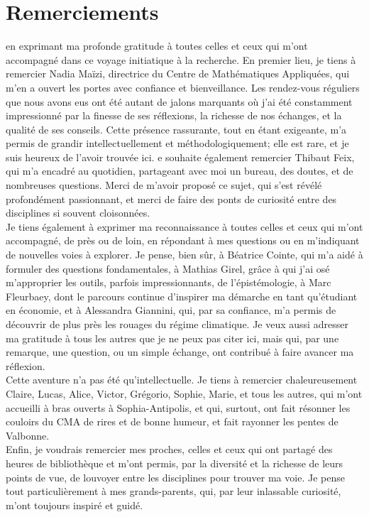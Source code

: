 \chapter*{Remerciements}


en exprimant ma profonde gratitude à toutes celles et ceux qui m’ont accompagné dans ce voyage initiatique à la recherche. En premier lieu, je tiens à remercier Nadia Maïzi, directrice du Centre de Mathématiques Appliquées, qui m'en a ouvert les portes avec confiance et bienveillance. Les rendez-vous réguliers que nous avons eus ont été autant de jalons marquants où j’ai été constamment impressionné par la finesse de ses réflexions, la richesse de nos échanges, et la qualité de ses conseils.  Cette présence rassurante, tout en étant exigeante, m'a permis de grandir intellectuellement et méthodologiquement; elle est rare, et je suis heureux de l'avoir trouvée ici. e souhaite également remercier Thibaut Feix, qui m’a encadré au quotidien, partageant avec moi un bureau, des doutes, et de nombreuses questions. Merci de m’avoir proposé ce sujet, qui s’est révélé profondément passionnant, et merci de faire des ponts de curiosité entre des disciplines si souvent cloisonnées. \\



Je tiens également à exprimer ma reconnaissance à toutes celles et ceux qui m’ont accompagné, de près ou de loin, en répondant à mes questions ou en m'indiquant de nouvelles voies à explorer. Je pense, bien sûr, à Béatrice Cointe, qui m’a aidé à formuler des questions fondamentales, à Mathias Girel, grâce à qui j’ai osé m’approprier les outils, parfois impressionnants, de l’épistémologie, à Marc Fleurbaey, dont le parcours continue d’inspirer ma démarche en tant qu’étudiant en économie, et à Alessandra Giannini, qui, par sa confiance, m’a permis de découvrir de plus près les rouages du régime climatique. Je veux aussi adresser ma gratitude à tous les autres que je ne peux pas citer ici, mais qui, par une remarque, une question, ou un simple échange, ont contribué à faire avancer ma réflexion. \\


Cette aventure n’a pas été qu’intellectuelle. Je tiens à remercier chaleureusement Claire, Lucas, Alice, Victor, Grégorio, Sophie, Marie, et tous les autres, qui m'ont accueilli à bras ouverts à Sophia-Antipolis, et qui, surtout, ont fait résonner les couloirs du CMA de rires et de bonne humeur, et fait rayonner les pentes de Valbonne. \\


Enfin, je voudrais remercier mes proches, celles et ceux qui ont partagé des heures de bibliothèque et m'ont permis, par la diversité et la richesse de leurs points de vue, de louvoyer entre les disciplines pour trouver ma voie.  Je pense tout particulièrement à mes grands-parents, qui, par leur inlassable curiosité, m'ont toujours inspiré et guidé.
